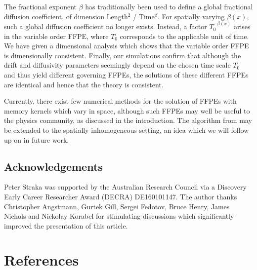 \documentclass[a4paper,12pt]{elsarticle}
\numberwithin{equation}{section}
\theoremstyle{plain}
\theoremstyle{definition}
\theoremstyle{remark}
\numberwithin{equation}{section}
\newcommand{\1}{\mathbf 1}
\begin{document}
The fractional exponent $\beta$ has traditionally been used to define a global fractional diffusion coefficient, of dimension Length$^2$ / Time$^\beta$.  For spatially varying $\beta(x)$, such a global diffusion coefficient no longer exists.  
Instead, a factor $T_0^{-\beta(x)}$ arises in the variable order FFPE, where $T_0$ corresponds to the applicable unit of time.  We have given a dimensional analysis which shows that the variable order FFPE is dimensionally consistent.  Finally, our simulations confirm that although the drift and diffusivity parameters seemingly depend on the chosen time scale $T_0$ and thus yield different governing FFPEs, the solutions of these different FFPEs are identical and hence that the theory is consistent. 

Currently, there exist few numerical methods for the solution of FFPEs with memory kernels which vary in space, although such FFPEs may well be useful to the physics community, as discussed in the introduction.  The algorithm from \citep{Gill2016} may be extended to the spatially inhomogeneous setting, an idea which we will follow up on in future work. 


\subsection*{Acknowledgements}
Peter Straka was supported by the Australian Research Council via a 
Discovery Early Career Researcher Award (DECRA) DE160101147. 
The author thanks Christopher Angstmann, Gurtek Gill, 
Sergei Fedotov, Bruce Henry, James Nichols and Nickolay Korabel for stimulating discussions which 
significantly improved the presentation of this article. 

\section*{References}


\end{document}
